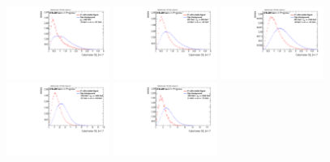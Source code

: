\begin{figure}[H]
\bigskip
\includegraphics[width=0.3\textwidth]{sascha_input/Appendix/Distributions/higgs/distributions/beta17/h_recoJet_D2_17_bin1.pdf} \hspace{1mm}
\includegraphics[width=0.3\textwidth]{sascha_input/Appendix/Distributions/higgs/distributions/beta17/h_recoJet_D2_17_bin2.pdf} \hspace{4mm}
\includegraphics[width=0.3\textwidth]{sascha_input/Appendix/Distributions/higgs/distributions/beta17/h_recoJet_D2_17_bin3.pdf} 
\bigskip
\includegraphics[width=0.3\textwidth]{sascha_input/Appendix/Distributions/higgs/distributions/beta17/h_recoJet_D2_17_bin4.pdf} \hspace{4mm}
\includegraphics[width=0.3\textwidth]{sascha_input/Appendix/Distributions/higgs/distributions/beta17/h_recoJet_D2_17_bin5.pdf} 


\end{figure}
